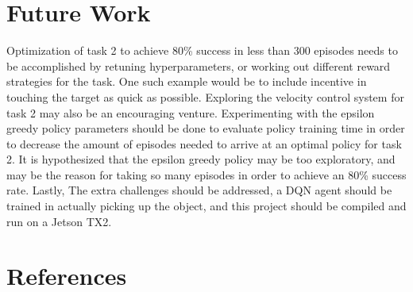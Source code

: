 \documentclass[1p, number, sort&compress,table, 11pt]{elsarticle}
\begin{document}

	\section{Future Work}\label{sec:future}
	Optimization of task 2 to achieve 80\% success in less than 300 episodes needs to be accomplished by retuning hyperparameters, or working out different reward strategies for the task. One such example would be to include incentive in touching the target as quick as possible. Exploring the velocity control system for task 2 may also be an encouraging venture. Experimenting with the epsilon greedy policy parameters should be done to evaluate policy training time in order to decrease the amount of episodes needed to arrive at an optimal policy for task 2. It is hypothesized that the epsilon greedy policy may be too exploratory, and may be the reason for taking so many episodes in order to achieve an 80\% success rate. Lastly, The extra challenges should be addressed, a DQN agent should be trained in actually picking up the object, and this project should be compiled and run on a Jetson TX2.

	
\section{References}
		
\end{document}
